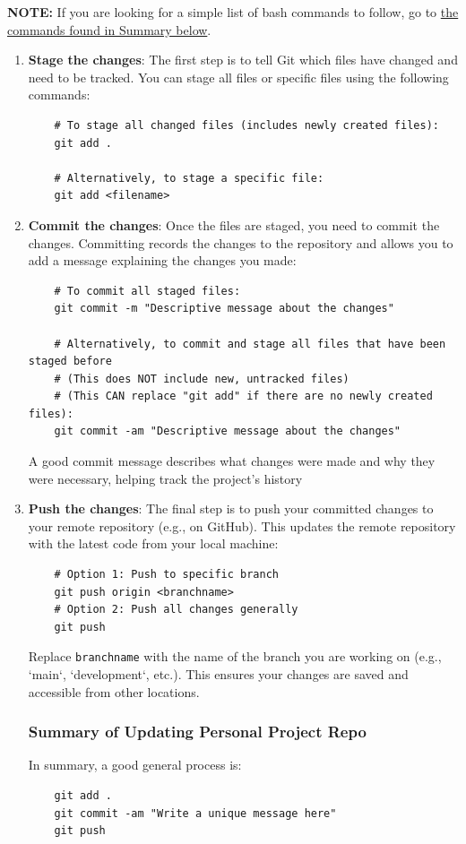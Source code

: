 \documentclass{article}
\begin{document}
\textbf{NOTE: } If you are looking for a simple list of bash commands to follow, go to \hyperref[summaryGit]{the commands found in Summary below}.
\begin{enumerate}
    \item \textbf{Stage the changes}: The first step is to tell Git which files have changed and need to be tracked. You can stage all files or specific files using the following commands:

    \begin{verbatim}
    # To stage all changed files (includes newly created files):
    git add .
    
    # Alternatively, to stage a specific file:
    git add <filename>
    \end{verbatim}

    \item \textbf{Commit the changes}: Once the files are staged, you need to commit the changes. Committing records the changes to the repository and allows you to add a message explaining the changes you made:

    \begin{verbatim}
    # To commit all staged files:
    git commit -m "Descriptive message about the changes"

    # Alternatively, to commit and stage all files that have been staged before
    # (This does NOT include new, untracked files)
    # (This CAN replace "git add" if there are no newly created files):
    git commit -am "Descriptive message about the changes"
    \end{verbatim}

    
    A good commit message describes what changes were made and why they were necessary, helping track the project's history


    \item \textbf{Push the changes}: The final step is to push your committed changes to your remote repository (e.g., on GitHub). This updates the remote repository with the latest code from your local machine:

    \begin{verbatim}
    # Option 1: Push to specific branch
    git push origin <branchname>
    # Option 2: Push all changes generally
    git push
    \end{verbatim}

    Replace \texttt{branchname} with the name of the branch you are working on (e.g., `main`, `development`, etc.). This ensures your changes are saved and accessible from other locations.
    \subsubsection{Summary of Updating Personal Project Repo}
    
    \label{summaryGit}

    In summary, a good general process is:
    \begin{verbatim}
    git add .
    git commit -am "Write a unique message here"
    git push
    \end{verbatim}
\end{enumerate}
\end{document}
